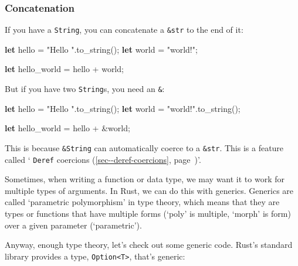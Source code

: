 \documentclass[a4paper,]{book}
\renewcommand*{\hyperref}[2][\ar]{%
  \def\ar{#2}%
  #2 (\autoref{#1}, page~\pageref{#1})}
\newenvironment{Shaded}{\begin{snugshade}}{\end{snugshade}}
\newcommand{\KeywordTok}[1]{\textcolor[rgb]{0.13,0.29,0.53}{\textbf{{#1}}}}
\newcommand{\StringTok}[1]{\textcolor[rgb]{0.31,0.60,0.02}{{#1}}}
\newcommand{\NormalTok}[1]{{#1}}
\begin{document}
\subsubsection{Concatenation}\label{concatenation}

If you have a \texttt{String}, you can concatenate a \texttt{\&str} to
the end of it:

\begin{Shaded}
\begin{Highlighting}[]
\KeywordTok{let} \NormalTok{hello = }\StringTok{"Hello "}\NormalTok{.to_string();}
\KeywordTok{let} \NormalTok{world = }\StringTok{"world!"}\NormalTok{;}

\KeywordTok{let} \NormalTok{hello_world = hello + world;}
\end{Highlighting}
\end{Shaded}

But if you have two \texttt{String}s, you need an \texttt{\&}:

\begin{Shaded}
\begin{Highlighting}[]
\KeywordTok{let} \NormalTok{hello = }\StringTok{"Hello "}\NormalTok{.to_string();}
\KeywordTok{let} \NormalTok{world = }\StringTok{"world!"}\NormalTok{.to_string();}

\KeywordTok{let} \NormalTok{hello_world = hello + &world;}
\end{Highlighting}
\end{Shaded}

This is because \texttt{\&String} can automatically coerce to a
\texttt{\&str}. This is a feature called
`\hyperref[sec--deref-coercions]{\texttt{Deref} coercions}'.


Sometimes, when writing a function or data type, we may want it to work
for multiple types of arguments. In Rust, we can do this with generics.
Generics are called `parametric polymorphism' in type theory, which
means that they are types or functions that have multiple forms (`poly'
is multiple, `morph' is form) over a given parameter (`parametric').

Anyway, enough type theory, let's check out some generic code. Rust's
standard library provides a type,
\texttt{Option\textless{}T\textgreater{}}, that's generic:
\end{document}
